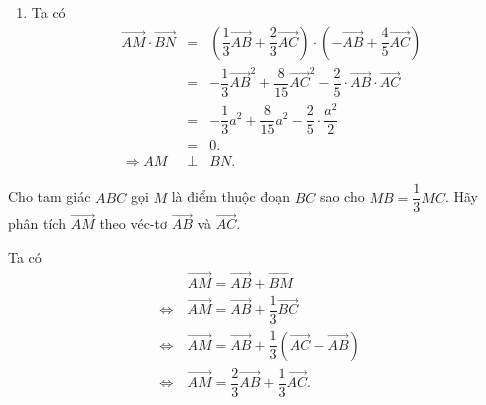 \begin{bt}
{\begin{enumerate}
{\begin{tikzpicture}[scale=1, line join=round, line cap=round]
	\end{tikzpicture}}
	\item Ta có
	\begin{eqnarray*}
		\overrightarrow{AM}\cdot\overrightarrow{BN}&=&\left(\dfrac{1}{3}\overrightarrow{AB}+\dfrac{2}{3}\overrightarrow{AC}\right)\cdot\left(-\overrightarrow{AB}+\dfrac{4}{5}\overrightarrow{AC}\right)\\
		&=&-\dfrac{1}{3}\overrightarrow{AB}^2+\dfrac{8}{15}\overrightarrow{AC}^2-\dfrac{2}{5}\cdot\overrightarrow{AB}\cdot\overrightarrow{AC}\\
		&=&-\dfrac{1}{3}a^2+\dfrac{8}{15}a^2-\dfrac{2}{5}\cdot\dfrac{a^2}{2}\\
		&=&0.\\
		\Rightarrow AM&\perp&BN.
	\end{eqnarray*}
		\end{enumerate}
		
		}
\end{bt}

\begin{bt}%
Cho tam giác $ABC$ gọi $M$ là điểm thuộc đoạn $BC$ sao cho $MB=\dfrac{1}{3}MC$. Hãy phân tích $\overrightarrow{AM}$ theo véc-tơ $\overrightarrow{AB}$ và $\overrightarrow{AC}$.
\loigiai
{
\immini
{
Ta có
$$\begin{aligned}
& \ \overrightarrow{AM}=\overrightarrow{AB}+\overrightarrow{BM} \\
\Leftrightarrow & \ \overrightarrow{AM}=\overrightarrow{AB}+\dfrac{1}{3}\overrightarrow{BC} \\
\Leftrightarrow & \ \overrightarrow{AM}=\overrightarrow{AB}+\dfrac{1}{3}\left(\overrightarrow{AC}-\overrightarrow{AB}\right) \\
\Leftrightarrow & \ \overrightarrow{AM}=\dfrac{2}{3}\overrightarrow{AB}+\dfrac{1}{3}\overrightarrow{AC}.
\end{aligned}$$
}
{
}
}
\end{bt}

